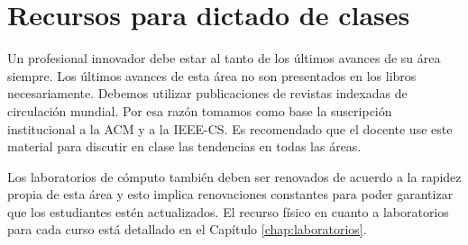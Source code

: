 \section{Recursos para dictado de clases}\label{sec:resources-to-teach}
Un profesional innovador debe estar al tanto de los últimos avances de su área siempre. Los últimos avances de esta área no son presentados en los libros necesariamente. Debemos utilizar publicaciones de revistas indexadas de circulación mundial. Por esa razón tomamos como base la suscripción institucional a la ACM y a la IEEE-CS. Es recomendado que el docente use este material para discutir en clase las tendencias en todas las áreas.

Los laboratorios de cómputo también deben ser renovados de acuerdo a la rapidez
propia de esta área y esto implica renovaciones constantes para poder garantizar
que los estudiantes estén actualizados.
El recurso fí­sico en cuanto a laboratorios para cada curso está detallado en el Capí­tulo \ref{chap:laboratorios}.
